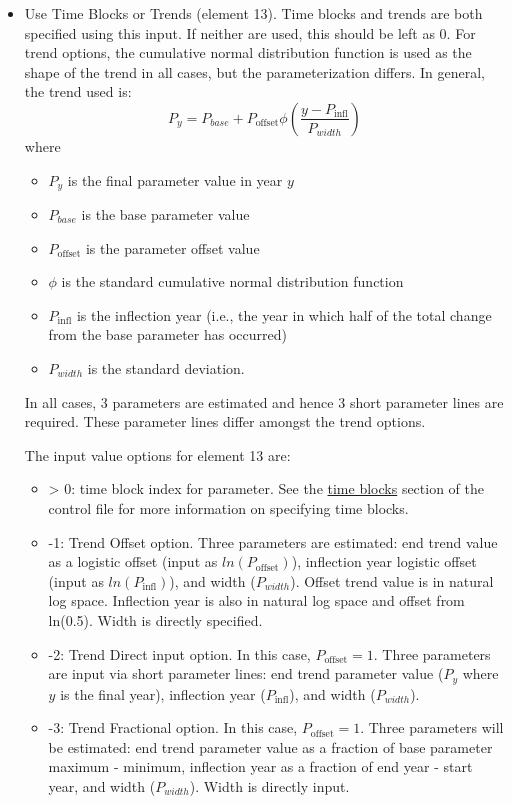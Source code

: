 \begin{itemize}
\item Use Time Blocks or Trends (element 13). Time blocks and trends are both specified using this input. If neither are used, this should be left as 0. For trend options, the cumulative normal distribution function is used as the shape of the trend in all cases, but the parameterization differs. In general, the trend used is: 
    \begin{equation}
	    P_y = P_{base} + P_{\text{offset}}\phi(\frac{y - P_{\text{infl}}}{P_{width}})
	\end{equation}
	where
	\begin{itemize} 
	    \item $P_y$ is the final parameter value in year $y$
		\item $P_{base}$ is the base parameter value
		\item $P_{\text{offset}}$ is the parameter offset value
		\item $\phi$ is the standard cumulative normal distribution function
		\item $P_{\text{infl}}$ is the inflection year (i.e., the year in which half of the total change from the base parameter has occurred)
		\item $P_{width}$ is the standard deviation.
	\end{itemize}
In all cases, 3 parameters are estimated and hence 3 short parameter lines are required. These parameter lines differ amongst the trend options.

The input value options for element 13 are:
	\begin{itemize}
		\item > 0: time block index for parameter. See the \hyperlink{timeblocks}{time blocks} section of the control file for more information on specifying time blocks.
		\item -1: Trend Offset option. Three parameters are estimated: end trend value as a logistic offset (input as $ln(P_{\text{offset}})$), inflection year logistic offset (input as $ln(P_{\text{infl}})$), and width ($P_{width}$). Offset trend value is in natural log space. Inflection year is also in natural log space and offset from ln(0.5). Width is directly specified.
		\item -2: Trend Direct input option. In this case, $P_{\text{offset}} = 1$. Three parameters are input via short parameter lines: end trend parameter value ($P_y$ where $y$ is the final year), inflection year ($P_{\text{infl}}$), and width ($P_{width}$). 
		\item -3: Trend Fractional option. In this case, $P_{\text{offset}} = 1$. Three parameters will be estimated: end trend parameter value as a fraction of base parameter maximum - minimum, inflection year as a fraction of end year - start year, and width ($P_{width}$). Width is directly input.
	\end{itemize}
	

\end{itemize}
